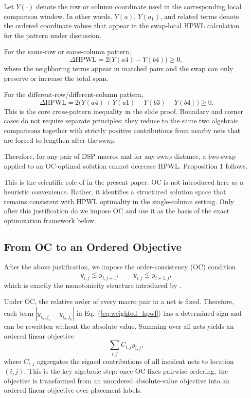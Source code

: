 Let $Y(\cdot)$ denote the row or column coordinate used in the corresponding local comparison window. In other words, $Y(a)$, $Y(a_1)$, and related terms denote the ordered coordinate values that appear in the swap-local HPWL calculation for the pattern under discussion.

For the same-row or same-column pattern,
\begin{equation}
\Delta \mathrm{HPWL} = 2\bigl(Y(a4)-Y(b4)\bigr) \ge 0,
\label{eq:swap_same_line}
\end{equation}
where the neighboring terms appear in matched pairs and the swap can only preserve or increase the total span.

For the different-row/different-column pattern,
\begin{equation}
\Delta \mathrm{HPWL}
=
2\bigl(Y(a4)+Y(a1)-Y(b3)-Y(b4)\bigr) \ge 0.
\label{eq:swap_cross}
\end{equation}
This is the core cross-pattern inequality in the slide proof. Boundary and corner cases do not require separate principles; they reduce to the same two algebraic comparisons together with strictly positive contributions from nearby nets that are forced to lengthen after the swap.

Therefore, for any pair of DSP macros and for any swap distance, a two-swap applied to an OC-optimal solution cannot decrease HPWL. Proposition 1 follows.

This is the scientific role of \rsad in the present paper. OC is not introduced here as a heuristic convenience. Rather, it identifies a structured solution space that remains consistent with HPWL optimality in the single-column setting. Only after this justification do we impose OC and use it as the basis of the exact optimization framework below.

\subsection{From OC to an Ordered Objective}

After the above justification, we impose the order-consistency (OC) condition
\begin{equation}
y_{i,j} \le y_{i,j+1}, \qquad y_{i,j} \le y_{i+1,j},
\label{eq:oc}
\end{equation}
which is exactly the monotonicity structure introduced by \rsad.

Under OC, the relative order of every macro pair in a net is fixed. Therefore, each term $|y_{i_a,j_a}-y_{i_b,j_b}|$ in Eq.~(\ref{eq:weighted_hpwl}) has a determined sign and can be rewritten without the absolute value. Summing over all nets yields an ordered linear objective
\begin{equation}
\sum_{i,j} C_{i,j} y_{i,j},
\label{eq:ordered_linear}
\end{equation}
where $C_{i,j}$ aggregates the signed contributions of all incident nets to location $(i,j)$. This is the key algebraic step: once OC fixes pairwise ordering, the \hpwl objective is transformed from an unordered absolute-value objective into an ordered linear objective over placement labels.

